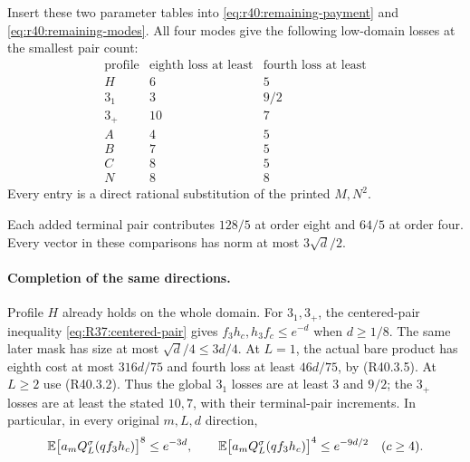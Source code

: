 Insert these two parameter tables into
\eqref{eq:r40:remaining-payment} and \eqref{eq:r40:remaining-modes}.
All four modes give the following low-domain losses at the smallest
pair count:
\[
 \begin{array}{c|cc}
 \text{profile}&\text{eighth loss at least}&\text{fourth loss at least}\\ \hline
 H&6&5\\
 3_1&3&9/2\\
 3_+&10&7\\
 A&4&5\\
 B&7&5\\
 C&8&5\\
 N&8&8
 \end{array}
\]
Every entry is a direct rational substitution of the printed \(M,N^2\).

Each added terminal pair contributes \(128/5\) at order eight and
\(64/5\) at order four. Every vector in these comparisons has norm
at most \(3\sqrt d/2\).

\paragraph{Completion of the same directions.}
Profile \(H\) already holds on the whole domain.
For \(3_1,3_+\), the centered-pair inequality
\eqref{eq:R37:centered-pair} gives \(f_3h_c,h_3f_c\le e^{-d}\)
when \(d\ge1/8\).
The same later mask has size at most \(\sqrt d/4\le3d/4\).
At \(L=1\), the actual bare product has eighth cost at most
\(316d/75\) and fourth loss at least \(46d/75\), by
(R40.3.5). At \(L\ge2\) use (R40.3.2).
Thus the global \(3_1\) losses are at least \(3\) and \(9/2\);
the \(3_+\) losses are at least the stated \(10,7\), with their
terminal-pair increments.
In particular, in every original \(m,L,d\) direction,
\begin{equation}\label{eq:r40:remaining-three-single}
 \mathbb E\bigl[a_mQ_L^\sigma(qf_3h_c)\bigr]^8\le e^{-3d},
 \qquad
 \mathbb E\bigl[a_mQ_L^\sigma(qf_3h_c)\bigr]^4\le e^{-9d/2}
 \quad(c\ge4).
\end{equation}

